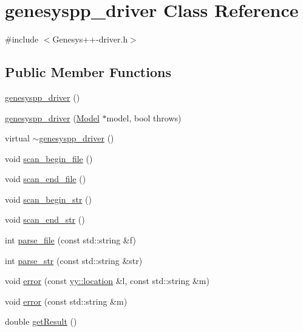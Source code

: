\hypertarget{classgenesyspp__driver}{\section{genesyspp\-\_\-driver Class Reference}
\label{classgenesyspp__driver}
}


{\ttfamily \#include $<$Genesys++-\/driver.\-h$>$}

\subsection*{Public Member Functions}
\begin{DoxyCompactItemize}
\item 
\hyperlink{classgenesyspp__driver_a983981a57103af3b45f84c1341812b97}{genesyspp\-\_\-driver} ()
\item 
\hyperlink{classgenesyspp__driver_a84483fcf1a1c5fa027080f42606445a3}{genesyspp\-\_\-driver} (\hyperlink{class_model}{Model} $\ast$model, bool throws)
\item 
virtual \hyperlink{classgenesyspp__driver_a65273b95ecd409a5d3b9d69db01b0a22}{$\sim$genesyspp\-\_\-driver} ()
\item 
void \hyperlink{classgenesyspp__driver_a5eea881839774961325ae71d8ef66f73}{scan\-\_\-begin\-\_\-file} ()
\item 
void \hyperlink{classgenesyspp__driver_aa060aec7c6cd20f6f2dcc0b9585ee08e}{scan\-\_\-end\-\_\-file} ()
\item 
void \hyperlink{classgenesyspp__driver_a40341e19c618eadfd15fe7333cd9bf48}{scan\-\_\-begin\-\_\-str} ()
\item 
void \hyperlink{classgenesyspp__driver_a3d922efe7cbc54b75574ee1060b05503}{scan\-\_\-end\-\_\-str} ()
\item 
int \hyperlink{classgenesyspp__driver_a2f58e23b084877eee330915c2f4fc71f}{parse\-\_\-file} (const std\-::string \&f)
\item 
int \hyperlink{classgenesyspp__driver_a5e63bd1621e53aa24cf2dee47d53ebdc}{parse\-\_\-str} (const std\-::string \&str)
\item 
void \hyperlink{classgenesyspp__driver_aa5ff905a2ee7b4b432ef589617e5d772}{error} (const \hyperlink{classyy_1_1location}{yy\-::location} \&l, const std\-::string \&m)
\item 
void \hyperlink{classgenesyspp__driver_a6090fae657d27d1825221564411a7dc1}{error} (const std\-::string \&m)
\item 
double \hyperlink{classgenesyspp__driver_a10d4649f733221a892e0d6f5fe3659d3}{get\-Result} ()

\end{DoxyCompactItemize}
